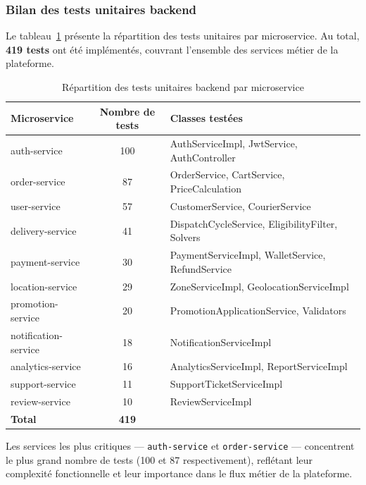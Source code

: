 \subsubsection{Bilan des tests unitaires backend}

Le tableau~\ref{tab:unit-tests-backend} présente la répartition des tests unitaires
par microservice. Au total, \textbf{419 tests} ont été implémentés, couvrant l'ensemble
des services métier de la plateforme.

\begin{table}[H]
\centering
\caption{Répartition des tests unitaires backend par microservice}
\label{tab:unit-tests-backend}
\begin{tabular}{l c l}
\toprule
\textbf{Microservice} & \textbf{Nombre de tests} & \textbf{Classes testées} \\
\midrule
auth-service         & 100 & AuthServiceImpl, JwtService, AuthController \\
order-service        &  87 & OrderService, CartService, PriceCalculation \\
user-service         &  57 & CustomerService, CourierService \\
delivery-service     &  41 & DispatchCycleService, EligibilityFilter, Solvers \\
payment-service      &  30 & PaymentServiceImpl, WalletService, RefundService \\
location-service     &  29 & ZoneServiceImpl, GeolocationServiceImpl \\
promotion-service    &  20 & PromotionApplicationService, Validators \\
notification-service &  18 & NotificationServiceImpl \\
analytics-service    &  16 & AnalyticsServiceImpl, ReportServiceImpl \\
support-service      &  11 & SupportTicketServiceImpl \\
review-service       &  10 & ReviewServiceImpl \\
\midrule
\textbf{Total}       & \textbf{419} & \\
\bottomrule
\end{tabular}
\end{table}

Les services les plus critiques --- \texttt{auth-service} et \texttt{order-service} ---
concentrent le plus grand nombre de tests (100 et 87 respectivement), reflétant leur
complexité fonctionnelle et leur importance dans le flux métier de la plateforme.

